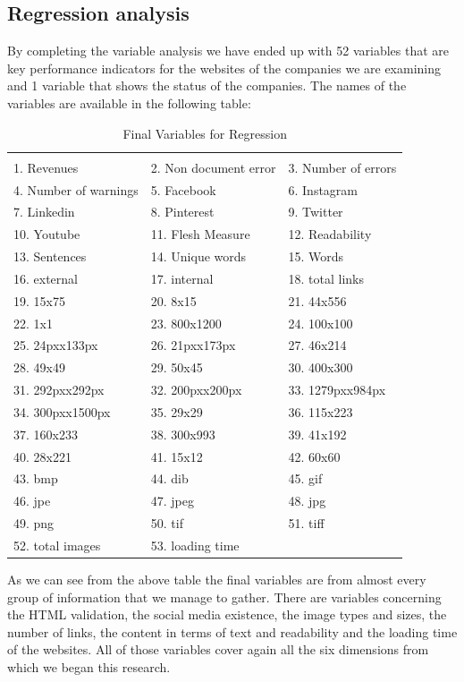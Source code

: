 \documentclass{book}
\begin{document}
\subsection{Regression analysis}
By completing the variable analysis we have ended up with 52 variables that are key performance indicators for the websites of the companies we are examining and 1 variable that shows the status of the companies. The names of the variables are available in the following table:
\begin{table}[H]
\centering
\caption{Final Variables for Regression}
\begin{tabular}{lll}
\hline & & \\
1.	Revenues
& 2.	Non document error
& 3.	Number of errors
\\4.	Number of warnings
& 5.	Facebook
& 6.	Instagram
\\7.	Linkedin
& 8.	Pinterest
& 9.	Twitter
\\10.	Youtube
& 11.	Flesh Measure
& 12.	Readability
\\13.	Sentences
& 14.	Unique words
& 15.	Words
\\16.	external
& 17.	internal
& 18.	total links
\\19.	15x75
& 20.	8x15
& 21.	44x556
\\22.	1x1
& 23.	800x1200
& 24.	100x100
\\25.	24pxx133px
& 26.	21pxx173px
& 27.	46x214
\\28.	49x49
& 29.	50x45
& 30.	400x300
\\31.	292pxx292px
& 32.	200pxx200px
& 33.	1279pxx984px
\\34.	300pxx1500px
& 35.	29x29
& 36.	115x223
\\37.	160x233
& 38.	300x993
& 39.	41x192
\\40.	28x221
& 41.	15x12
& 42.	60x60
\\43.	bmp
& 44.	dib
& 45.	gif
\\46.	jpe
& 47.	jpeg
& 48.	jpg
\\49.	png
& 50.	tif
& 51.	tiff
\\52.	total images
& 53.	loading time     
\\ \hline
\end{tabular}
\end{table}
As we can see from the above table the final variables are from almost every group of information that we manage to gather. There are variables concerning the HTML validation, the social media existence, the image types and sizes, the number of links, the content in terms of text and readability and the loading time of the websites. All of those variables cover again all the six dimensions from which we began this research.\\
\end{document}
